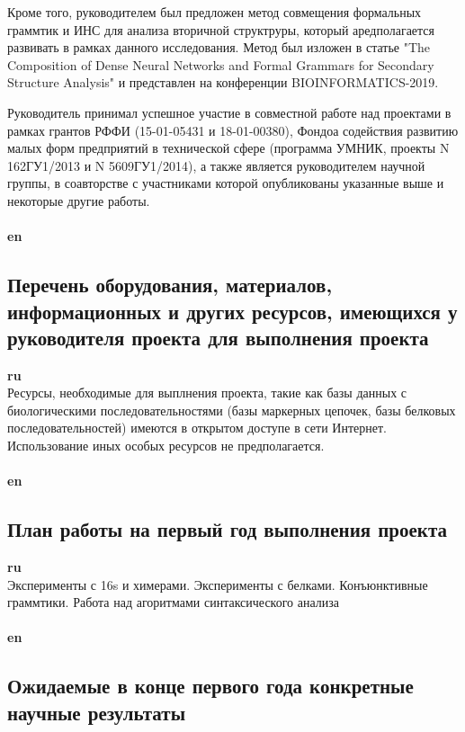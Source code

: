 \documentclass[12pt]{article}  %
\theoremstyle{remark}
\begin{document}
Кроме того, руководителем был предложен метод совмещения формальных граммтик и ИНС для анализа вторичной структруры, который аредполагается развивать в рамках данного исследования. Метод был изложен в статье "The Composition of Dense Neural Networks and Formal Grammars for Secondary Structure Analysis" и представлен на конференции BIOINFORMATICS-2019.

Руководитель принимал успешное участие в совместной работе над проектами в рамках грантов РФФИ (15-01-05431 и 18-01-00380), Фондоа содействия развитию малых форм предприятий в технической сфере
(программа УМНИК, проекты N 162ГУ1/2013 и N 5609ГУ1/2014), а также является руководителем научной группы, в соавторстве с участниками которой опубликованы указанные выше и некоторые другие работы.
\\
\\
\textbf{en}\\

\subsection{Перечень оборудования, материалов, информационных и других ресурсов, имеющихся у руководителя проекта для выполнения проекта }
\textbf{ru}\\
Ресурсы, необходимые для выплнения проекта, такие как базы данных с биологическими последовательностями (базы маркерных цепочек, базы белковых последовательностей) имеются в открытом доступе в сети Интернет.
Использование иных особых ресурсов не предполагается.
\\
\\
\textbf{en}\\


\subsection{План работы на первый год выполнения проекта}

\textbf{ru}\\
Эксперименты с 16s и химерами. Эксперименты с белками. Конъюнктивные граммтики. Работа над агоритмами синтаксического анализа
\\
\\
\textbf{en}\\

\subsection{Ожидаемые в конце первого года конкретные научные результаты}
\end{document}
